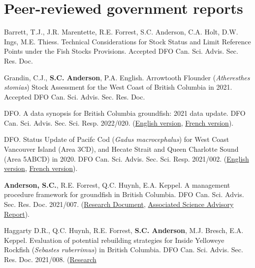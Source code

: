 \section{Peer-reviewed government
reports}\label{peer-reviewed-government-reports}

\begin{description}
\tightlist
\item[2023]
Barrett, T.J., J.R. Marentette, R.E. Forrest, S.C. Anderson, C.A. Holt,
D.W. Ings, M.E. Thiess. Technical Considerations for Stock Status and
Limit Reference Points under the Fish Stocks Provisions. Accepted DFO
Can. Sci. Advis. Sec. Res. Doc.
\item[2022]
Grandin, C.J., \textbf{S.C. Anderson}, P.A. English. Arrowtooth Flounder
(\emph{Atheresthes stomias}) Stock Assessment for the West Coast of
British Columbia in 2021. Accepted DFO Can. Sci. Advis. Sec. Res. Doc.
\item[2022]
DFO. A data synopsis for British Columbia groundfish: 2021 data update.
DFO Can. Sci. Advis. Sec. Sci. Resp. 2022/020.
(\href{https://www.dfo-mpo.gc.ca/csas-sccs/Publications/ScR-RS/2022/2022_020-eng.html}{English
version},
\href{https://www.dfo-mpo.gc.ca/csas-sccs/Publications/ScR-RS/2022/2022_020-fra.html}{French
version}).
\item[2021]
DFO. Status Update of Pacifc Cod (\emph{Gadus macrocephalus}) for West
Coast Vancouver Island (Area 3CD), and Hecate Strait and Queen Charlotte
Sound (Area 5ABCD) in 2020. DFO Can. Sci. Advis. Sec. Sci. Resp.
2021/002.
(\href{https://www.dfo-mpo.gc.ca/csas-sccs/Publications/ResDocs-DocRech/2021/2021_007-eng.html}{English
version},
\href{https://www.dfo-mpo.gc.ca/csas-sccs/Publications/ResDocs-DocRech/2021/2021_007-fra.html}{French
version}).
\item[2021]
\textbf{Anderson, S.C.}, R.E. Forrest, Q.C. Huynh, E.A. Keppel. A
management procedure framework for groundﬁsh in British Columbia. DFO
Can. Sci. Advis. Sec. Res. Doc. 2021/007.
(\href{https://www.dfo-mpo.gc.ca/csas-sccs/Publications/ResDocs-DocRech/2021/2021_007-eng.html}{Research
Document},
\href{https://www.dfo-mpo.gc.ca/csas-sccs/Publications/SAR-AS/2021/2021_002-eng.html}{Associated
Science Advisory Report}).
\item[2021]
Haggarty D.R., Q.C. Huynh, R.E. Forrest, \textbf{S.C. Anderson}, M.J.
Bresch, E.A. Keppel. Evaluation of potential rebuilding strategies for
Inside Yelloweye Rockfish (\emph{Sebastes ruberrimus}) in British
Columbia. DFO Can. Sci. Advis. Sec. Res. Doc. 2021/008.
(\href{https://www.dfo-mpo.gc.ca/csas-sccs/Publications/ResDocs-DocRech/2021/2021_008-eng.html}{Research
}
\end{description}
